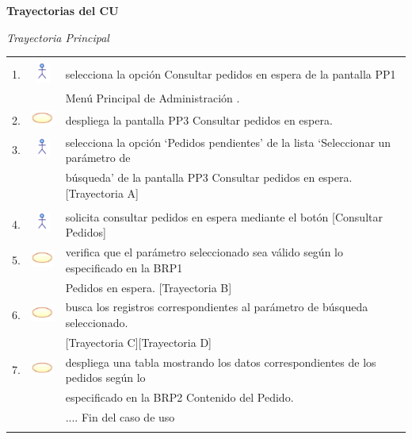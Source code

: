 \documentclass[10pt,spanish]{article}
\providecommand{\tabularnewline}{\\}
\begin{document}
	\newpage
	\textbf{\large Trayectorias del CU}{\large \par}
	\textit{\large Trayectoria Principal}{\large{} }{\large \par}
	\begin{tabular}{ccl}
	 &  & \tabularnewline
	1. & \includegraphics{actor} & selecciona la opción Consultar pedidos en espera de la pantalla PP1\tabularnewline	
    & & Menú Principal de Administración .\tabularnewline	
	2. & \includegraphics{sistema} & despliega la pantalla PP3 Consultar pedidos en espera.\tabularnewline			 
	3. & \includegraphics{actor} & selecciona la opción ‘Pedidos pendientes’ de la lista ‘Seleccionar un parámetro de\tabularnewline
	& &  búsqueda’ de la pantalla PP3 Consultar pedidos en espera. [Trayectoria A]\tabularnewline
\tabularnewline
	4. & \includegraphics{actor} &  solicita consultar pedidos en espera mediante el botón [Consultar Pedidos]\tabularnewline
	5. & \includegraphics{sistema} & verifica que el parámetro seleccionado sea válido según lo especificado en la BRP1\tabularnewline 
	& & Pedidos en espera. [Trayectoria B]\tabularnewline
	6. & \includegraphics{sistema} & busca los registros correspondientes al parámetro de búsqueda seleccionado. \tabularnewline
	& &  [Trayectoria C][Trayectoria D]\tabularnewline
	7. & \includegraphics{sistema} & despliega una tabla mostrando los datos correspondientes de los pedidos según lo\tabularnewline
	& & especificado en la BRP2 Contenido del Pedido.\tabularnewline
	 &  & .... Fin del caso de uso\tabularnewline \\
	\end{tabular}
\end{document}
